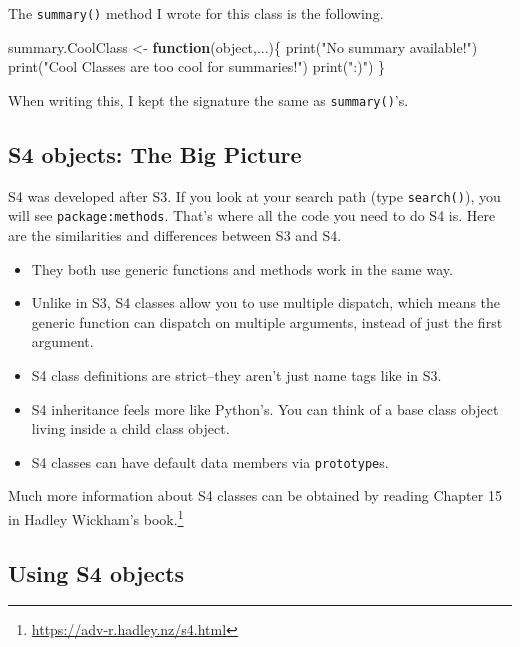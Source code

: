 \documentclass[
  12pt,
  krantz2]{krantz}
\makeatletter
\newenvironment{Shaded}{\begin{snugshade}}{\end{snugshade}}
\newcommand{\ControlFlowTok}[1]{\textcolor[rgb]{0.27,0.27,0.27}{\textbf{#1}}}
\newcommand{\FunctionTok}[1]{\textcolor[rgb]{0,0,0}{#1}}
\newcommand{\NormalTok}[1]{#1}
\newcommand{\OtherTok}[1]{\textcolor[rgb]{0.37,0.37,0.37}{#1}}
\newcommand{\StringTok}[1]{\textcolor[rgb]{0.5,0.5,0.5}{#1}}
\providecommand{\tightlist}{%
  \setlength{\itemsep}{0pt}\setlength{\parskip}{0pt}}
\renewcommand{\href}[2]{#2\footnote{\url{#1}}}
\newenvironment{kframe}{%
\medskip{}
\setlength{\fboxsep}{.8em}
 \def\at@end@of@kframe{}%
 \ifinner\ifhmode%
  \def\at@end@of@kframe{\end{minipage}}%
  \begin{minipage}{\columnwidth}%
 \fi\fi%
 \def\FrameCommand##1{\hskip\@totalleftmargin \hskip-\fboxsep
 \colorbox{shadecolor}{##1}\hskip-\fboxsep
     \hskip-\linewidth \hskip-\@totalleftmargin \hskip\columnwidth}%
 \MakeFramed {\advance\hsize-\width
   \@totalleftmargin\z@ \linewidth\hsize
   \@setminipage}}%
 {\par\unskip\endMakeFramed%
 \at@end@of@kframe}
\renewenvironment{Shaded}{\begin{kframe}}{\end{kframe}}
\makeatother
\begin{document}
The \texttt{summary()} method I wrote for this class is the following.

\begin{Shaded}
\begin{Highlighting}[]
\NormalTok{summary.CoolClass }\OtherTok{\textless{}{-}} \ControlFlowTok{function}\NormalTok{(object,...)\{}
  \FunctionTok{print}\NormalTok{(}\StringTok{"No summary available!"}\NormalTok{)}
  \FunctionTok{print}\NormalTok{(}\StringTok{"Cool Classes are too cool for summaries!"}\NormalTok{)}
  \FunctionTok{print}\NormalTok{(}\StringTok{":)"}\NormalTok{)}
\NormalTok{\}}
\end{Highlighting}
\end{Shaded}

When writing this, I kept the signature the same as \texttt{summary()}'s.

\hypertarget{s4-objects-the-big-picture}{%
\subsection{S4 objects: The Big Picture}\label{s4-objects-the-big-picture}}

S4 was developed after S3. If you look at your search path (type \texttt{search()}), you will see \texttt{package:methods}. That's where all the code you need to do S4 is. Here are the similarities and differences between S3 and S4.

\begin{itemize}
\tightlist
\item
  They both use generic functions and methods work in the same way.
\item
  Unlike in S3, S4 classes allow you to use multiple dispatch, which means the generic function can dispatch on multiple arguments, instead of just the first argument.
\item
  S4 class definitions are strict--they aren't just name tags like in S3.
\item
  S4 inheritance feels more like Python's. You can think of a base class object living inside a child class object.
\item
  S4 classes can have default data members via \texttt{prototype}s.
\end{itemize}

Much more information about S4 classes can be obtained by reading \href{https://adv-r.hadley.nz/s4.html}{Chapter 15 in Hadley Wickham's book.}

\hypertarget{using-s4-objects}{%
\subsection{Using S4 objects}\label{using-s4-objects}}
\end{document}
